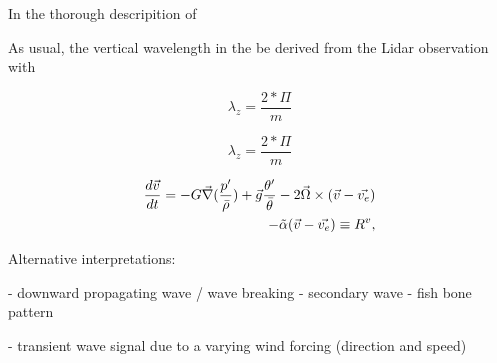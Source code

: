 In the thorough descripition of 


As usual, the vertical wavelength in the  be derived from the Lidar observation with

\begin{equation}
    \lambda_z = \frac{2*\Pi}{m} 
\end{equation}

\begin{equation}
    \lambda_z = \frac{2*\Pi}{m} 
\end{equation}


\begin{equation}
\begin{aligned}
    \frac{d \Vec{v}}{dt} = -G \Vec{\nabla} (\frac{p'}{\bar{\rho}}) +  \Vec{g} \frac{\theta'}{\bar{\theta}} - 2 \Vec{\Omega} \times (\Vec{v}-\Vec{v_e}) \\
    - \Tilde{\alpha} (\Vec{v}-\Vec{v_e}) \equiv R^{v},
\end{aligned}
\end{equation}

Alternative interpretations:

- downward propagating wave / wave breaking - secondary wave - fish bone pattern

- transient wave signal due to a varying wind forcing (direction and speed) 


